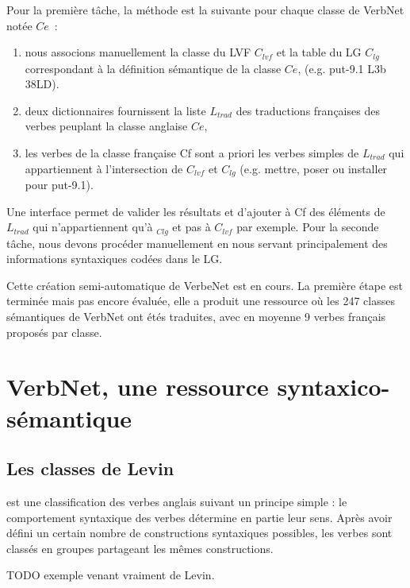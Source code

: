 Pour la première tâche, la méthode est la suivante pour chaque classe de VerbNet notée $Ce$ :
\begin{enumerate}
    \item nous associons manuellement la classe du LVF $C_{lvf}$ et la table du LG $C_{lg}$ correspondant à la définition sémantique de la classe $Ce$, (e.g. put-9.1 L3b 38LD).
    \item deux dictionnaires fournissent la liste $L_{trad}$ des traductions françaises des verbes peuplant la classe anglaise $Ce$, 
    \item les verbes de la classe française Cf sont a priori les verbes simples de $L_{trad}$ qui appartiennent à l'intersection de $C_{lvf}$ et $C_{lg}$ (e.g. mettre, poser ou installer pour put-9.1).
\end{enumerate}

Une interface permet de valider les résultats et d'ajouter à Cf des éléments de $L_{trad}$ qui n'appartiennent qu'à $_{Clg}$ et pas à $C_{lvf}$ par exemple. Pour la seconde tâche, nous devons procéder manuellement en nous servant principalement des informations syntaxiques codées dans le LG.

Cette création semi-automatique de VerbeNet est en cours. La première étape est terminée mais pas encore évaluée, elle a produit une ressource où les 247 classes sémantiques de VerbNet ont étés traduites, avec en moyenne 9 verbes français proposés par classe.

\section{VerbNet, une ressource syntaxico-sémantique}

\subsection{Les classes de Levin}

\cite{levin1993english} est une classification des verbes anglais suivant un principe simple : le comportement syntaxique des verbes détermine en partie leur sens. Après avoir défini un certain nombre de constructions syntaxiques possibles, les verbes sont classés en groupes partageant les mêmes constructions.

TODO exemple venant vraiment de Levin.

